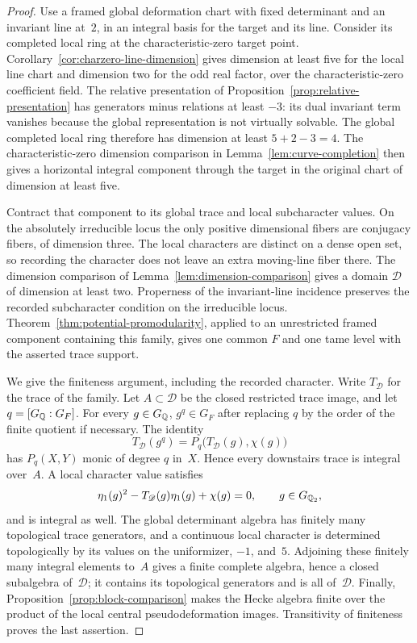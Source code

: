 \begin{proof}
Use a framed global deformation chart with fixed determinant and an
invariant line at~$2$, in an integral basis for the target and its line.
Consider its completed local ring at the characteristic-zero target
point.  Corollary~\ref{cor:charzero-line-dimension} gives dimension
at least five for the local line chart and dimension two for the odd
real factor, over the characteristic-zero coefficient field.
The relative presentation of Proposition~\ref{prop:relative-presentation}
has generators minus relations at least $-3$: its dual invariant term
vanishes because the global representation is not virtually solvable.
The global completed local ring therefore has dimension at least
$5+2-3=4$.  The characteristic-zero dimension comparison in
Lemma~\ref{lem:curve-completion} then gives a horizontal integral
component through the target in the original chart of dimension at
least five.

Contract that component to its global trace and local subcharacter
values.  On the absolutely irreducible locus the only positive
dimensional fibers are conjugacy fibers, of dimension three.  The local
characters are distinct on a dense open set, so recording the character
does not leave an extra moving-line fiber there.  The dimension
comparison of Lemma~\ref{lem:dimension-comparison} gives a domain
$\mathscr D$ of dimension at least two.  Properness of the invariant-line
incidence preserves the recorded subcharacter condition on the
irreducible locus.  Theorem~\ref{thm:potential-promodularity}, applied to
an unrestricted framed component containing this family, gives one
common $F$ and one tame level with the asserted trace support.

We give the finiteness argument, including the recorded character.
Write $T_{\mathscr D}$ for the trace of the family.
Let $A\subset\mathscr D$ be the closed restricted trace image, and let
$q=[G_{\mathbb Q}:G_F]$.  For every $g\in G_{\mathbb Q}$, $g^q\in G_F$ after
replacing $q$ by the order of the finite quotient if necessary.
The identity
\[
 T_{\mathscr D}(g^q)=P_q\bigl(T_{\mathscr D}(g),\chi(g)\bigr)
\]
has $P_q(X,Y)$ monic of degree $q$ in~$X$.  Hence every downstairs
trace is integral over~$A$.  A local character value satisfies
\[
 \eta_1(g)^2-T_{\mathscr D}(g)\eta_1(g)+\chi(g)=0,
 \qquad g\in G_{\mathbb Q_2},
\]
and is integral as well.  The global determinant algebra has finitely
many topological trace generators, and a continuous local character is
determined topologically by its values on the uniformizer, $-1$, and~$5$.
Adjoining these finitely many integral elements to~$A$ gives a finite
complete algebra, hence a closed subalgebra of~$\mathscr D$; it contains
its topological generators and is all of~$\mathscr D$.
Finally, Proposition~\ref{prop:block-comparison} makes the Hecke algebra
finite over the product of the local central pseudodeformation images.
Transitivity of finiteness proves the last assertion.
\end{proof}

